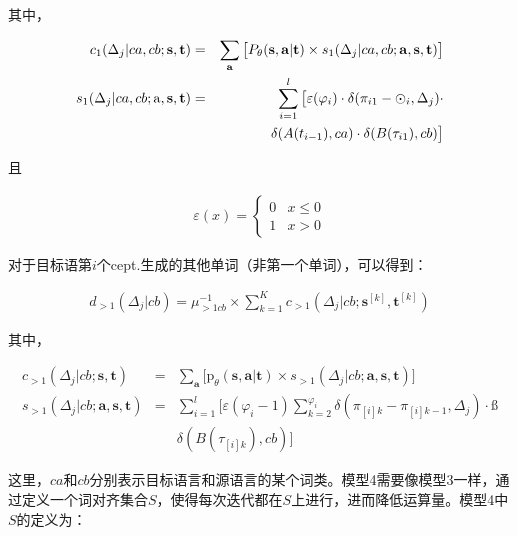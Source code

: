 \begin{appendices}
其中，

\begin{eqnarray}
c_1(\Delta_j|ca,cb;\mathbf{s},\mathbf{t})           & = & \sum_{\mathbf{a}}\big[{P}_{\theta}(\mathbf{s},\mathbf{a}|\mathbf{t}) \times s_1(\Delta_j|ca,cb;\mathbf{a},\mathbf{s},\mathbf{t})\big] \label{eq:1.16} \\
s_1(\Delta_j|ca,cb;\rm{a},\mathbf{s},\mathbf{t}) & = & \sum_{i=1}^l \big[\varepsilon(\varphi_i) \cdot \delta(\pi_{i1}-\odot _{i},\Delta_j) \cdot \nonumber \\
                                                                           &     & \delta(A(t_{i-1}),ca) \cdot \delta(B(\tau_{i1}),cb) \big] \label{eq:1.17}
\end{eqnarray}

且

\begin{eqnarray}
\varepsilon(x) = \begin{cases}
0 & x \leq 0 \\
1 & x > 0
\end{cases}
\label{eq:1.21}
\end{eqnarray}

对于目标语第$i$个cept.生成的其他单词（非第一个单词），可以得到：

\begin{eqnarray}
d_{>1}(\Delta_j|cb) = \mu_{>1cb}^{-1} \times \sum_{k=1}^{K}c_{>1}(\Delta_j|cb;\mathbf{s}^{[k]},\mathbf{t}^{[k]})
\label{eq:1.18}
\end{eqnarray}

其中，

\begin{eqnarray}
c_{>1}(\Delta_j|cb;\mathbf{s},\mathbf{t})                  & = & \sum_{\mathbf{a}}\big[\textrm{p}_{\theta}(\mathbf{s},\mathbf{a}|\mathbf{t}) \times s_{>1}(\Delta_j|cb;\mathbf{a},\mathbf{s},\mathbf{t}) \big] \label{eq:1.19} \\
s_{>1}(\Delta_j|cb;\mathbf{a},\mathbf{s},\mathbf{t}) & = & \sum_{i=1}^l \big[\varepsilon(\varphi_i-1)\sum_{k=2}^{\varphi_i}\delta(\pi_{[i]k}-\pi_{[i]k-1},\Delta_j) \cdot \nonumber ß\\
                                                                                  &    & \delta(B(\tau_{[i]k}),cb) \big] \label{eq:1.20}
\end{eqnarray}

\noindent 这里，$ca$和$cb$分别表示目标语言和源语言的某个词类。模型4需要像模型3一样，通过定义一个词对齐集合$S$，使得每次迭代都在$S$上进行，进而降低运算量。模型4中$S$的定义为：


\end{appendices}
